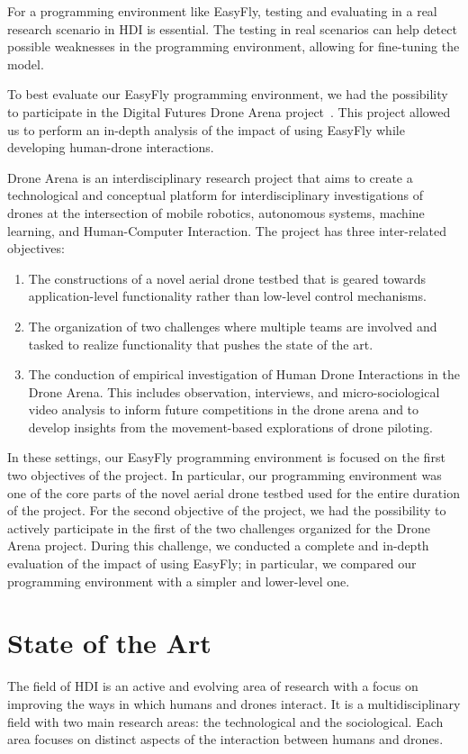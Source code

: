 For a programming environment like EasyFly, testing and evaluating in a real research scenario in HDI is essential. 
The testing in real scenarios can help detect possible weaknesses in the programming environment, allowing for fine-tuning the model.

To best evaluate our EasyFly programming environment, we had the possibility to participate in the Digital Futures Drone Arena project~\cite{dronearena}.
This project allowed us to perform an in-depth analysis of the impact of using EasyFly while developing human-drone interactions.

Drone Arena is an interdisciplinary research project that aims to create a technological and conceptual platform for interdisciplinary investigations of drones at the intersection of mobile robotics,
 autonomous systems, machine learning, and Human-Computer Interaction.
The project has three inter-related objectives:
\begin{enumerate}
    \item   The constructions of a novel aerial drone testbed that is geared towards application-level
            functionality rather than low-level control mechanisms.
    \item   The organization of two challenges where multiple teams are involved and tasked to realize
            functionality that pushes the state of the art.
    \item   The conduction of empirical investigation of Human Drone Interactions in the Drone Arena.
            This includes observation, interviews, and micro-sociological video analysis to inform future
            competitions in the drone arena and to develop insights from the movement-based explorations of drone piloting.
\end{enumerate}

In these settings, our EasyFly programming environment is focused on the first two objectives of the project.
In particular, our programming environment was one of the core parts of the novel aerial drone testbed used for the entire duration of the project. 
For the second objective of the project, we had the possibility to actively participate in the first of the two challenges organized for the Drone Arena project. 
During this challenge, we conducted a complete and in-depth evaluation of the impact of using EasyFly; 
in particular, we compared our programming environment with a simpler and lower-level one.


\section{State of the Art}\label{sec:intro_soa}
The field of HDI is an active and evolving area of research with a focus on improving the ways in which humans
and drones interact. It is a multidisciplinary field with two main research areas: the technological and the sociological.
Each area focuses on distinct aspects of the interaction between humans and drones.

